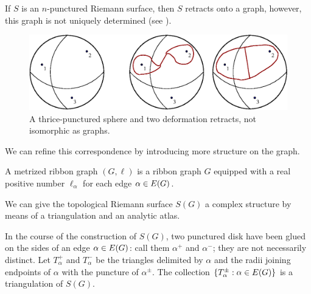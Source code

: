 If $S$ is an $n$-punctured Riemann surface, then $S$ retracts onto a
graph, however, this graph is not uniquely determined (see
).
\begin{figure}[bt]
  \centering\includegraphics[width=\textwidth]{sfera3}
  \caption{A thrice-punctured sphere and two deformation retracts, not
    isomorphic as graphs.}
  \label{fig:sphere-retracts}
\end{figure}
We can refine this correspondence by introducing more structure on the
graph.
\begin{definition}
  \label{dfn:metric-ribbon-graphs}
  A metrized ribbon graph $(G, \ell)$ is a ribbon graph $G$ equipped with
  a real positive number $\ell_\alpha$ for each edge $\alpha \in E(G)$.
\end{definition}

We can give the topological Riemann surface $S(G)$ a complex
structure by means of a triangulation and an analytic atlas.

In the course of the construction of $S(G)$, two punctured disk have
been glued on the sides of an edge $\alpha \in E(G)$: call them $\alpha^+$
and $\alpha^-$; they are not necessarily distinct.  Let $T_\alpha^+$ and $T_\alpha^-$
be the triangles delimited by $\alpha$ and the radii joining endpoints of
$\alpha$ with the puncture of $\alpha^\pm$. The collection $\{T_\alpha^\pm : \alpha \in
E(G)\}$ is a triangulation of $S(G)$.

